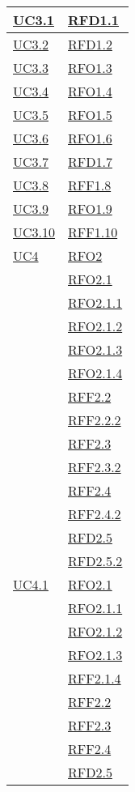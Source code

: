 \begin{longtable}{|>{\centering}m{5cm}|m{5cm}<{\centering}|}
\hyperlink{UC3.1}{UC3.1} & \hyperlink{RFD1.1}{RFD1.1}\\\hline
\hyperlink{UC3.2}{UC3.2} & \hyperlink{RFD1.2}{RFD1.2}\\\hline
\hyperlink{UC3.3}{UC3.3} & \hyperlink{RFO1.3}{RFO1.3}\\\hline
\hyperlink{UC3.4}{UC3.4} & \hyperlink{RFO1.4}{RFO1.4}\\\hline
\hyperlink{UC3.5}{UC3.5} & \hyperlink{RFO1.5}{RFO1.5}\\\hline
\hyperlink{UC3.6}{UC3.6} & \hyperlink{RFO1.6}{RFO1.6}\\\hline
\hyperlink{UC3.7}{UC3.7} & \hyperlink{RFD1.7}{RFD1.7}\\\hline
\hyperlink{UC3.8}{UC3.8} & \hyperlink{RFF1.8}{RFF1.8}\\\hline
\hyperlink{UC3.9}{UC3.9} & \hyperlink{RFO1.9}{RFO1.9}\\\hline
\hyperlink{UC3.10}{UC3.10} & \hyperlink{RFF1.10}{RFF1.10}\\\hline

\hyperlink{UC4}{UC4} 
& \hyperlink{RFO2}{RFO2}\\
& \hyperlink{RFO2.1}{RFO2.1}\\
& \hyperlink{RFO2.1.1}{RFO2.1.1}\\
& \hyperlink{RFO2.1.2}{RFO2.1.2}\\
& \hyperlink{RFO2.1.3}{RFO2.1.3}\\
& \hyperlink{RFO2.1.4}{RFO2.1.4}\\
& \hyperlink{RFF2.2}{RFF2.2}\\
& \hyperlink{RFF2.2.2}{RFF2.2.2}\\
& \hyperlink{RFF2.3}{RFF2.3}\\
& \hyperlink{RFF2.3.2}{RFF2.3.2}\\
& \hyperlink{RFF2.4}{RFF2.4}\\
& \hyperlink{RFF2.4.2}{RFF2.4.2}\\
& \hyperlink{RFF2.5}{RFD2.5}\\
& \hyperlink{RFF2.5.2}{RFD2.5.2}\\\hline


\hyperlink{UC4.1}{UC4.1} 
& \hyperlink{RFO2.1}{RFO2.1}\\
& \hyperlink{RFO2.1.1}{RFO2.1.1}\\
& \hyperlink{RFO2.1.2}{RFO2.1.2}\\
& \hyperlink{RFO2.1.3}{RFO2.1.3}\\
& \hyperlink{RFF2.1.4}{RFF2.1.4}\\
& \hyperlink{RFF2.2}{RFF2.2}\\
& \hyperlink{RFF2.3}{RFF2.3}\\
& \hyperlink{RFF2.4}{RFF2.4}\\
& \hyperlink{RFF2.5}{RFD2.5}\\\hline


\end{longtable}
